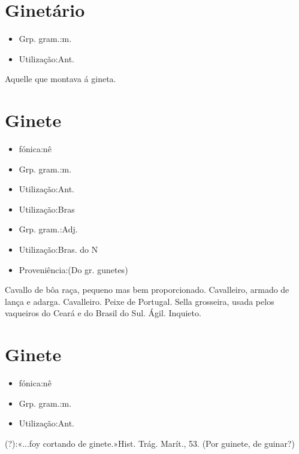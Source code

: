 \section{Ginetário}
\begin{itemize}
\item {Grp. gram.:m.}
\end{itemize}
\begin{itemize}
\item {Utilização:Ant.}
\end{itemize}
Aquelle que montava á gineta.
\section{Ginete}
\begin{itemize}
\item {fónica:nê}
\end{itemize}
\begin{itemize}
\item {Grp. gram.:m.}
\end{itemize}
\begin{itemize}
\item {Utilização:Ant.}
\end{itemize}
\begin{itemize}
\item {Utilização:Bras}
\end{itemize}
\begin{itemize}
\item {Grp. gram.:Adj.}
\end{itemize}
\begin{itemize}
\item {Utilização:Bras. do N}
\end{itemize}
\begin{itemize}
\item {Proveniência:(Do gr. \textunderscore gunetes\textunderscore )}
\end{itemize}
Cavallo de bôa raça, pequeno mas bem proporcionado.
Cavalleiro, armado de lança e adarga.
Cavalleiro.
Peixe de Portugal.
Sella grosseira, usada pelos vaqueiros do Ceará e do Brasil do Sul.
Ágil.
Inquieto.
\section{Ginete}
\begin{itemize}
\item {fónica:nê}
\end{itemize}
\begin{itemize}
\item {Grp. gram.:m.}
\end{itemize}
\begin{itemize}
\item {Utilização:Ant.}
\end{itemize}
(?):«\textunderscore ...foy cortando de ginete.\textunderscore »\textunderscore Hist. Trág. Marít.\textunderscore , 53.
(Por \textunderscore guinete\textunderscore , de \textunderscore guinar\textunderscore ?)
